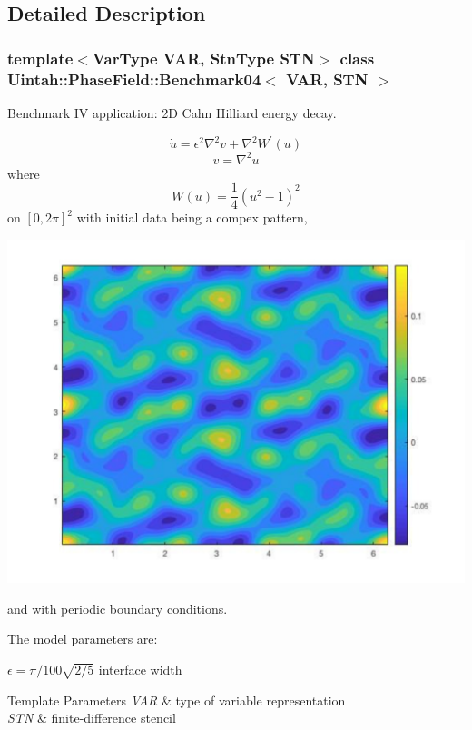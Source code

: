 \subsection{Detailed Description}
\subsubsection*{template$<$Var\+Type V\+AR, Stn\+Type S\+TN$>$\newline
class Uintah\+::\+Phase\+Field\+::\+Benchmark04$<$ V\+A\+R, S\+T\+N $>$}

Benchmark IV application\+: 2D Cahn Hilliard energy decay. 

\[ \dot u = \epsilon^2 \nabla^2 v + \nabla^2 W^\prime(u) \] \[ v = \nabla^2 u \] where \[ W (u) = \frac{1}{4} (u^2 − 1)^2 \] on $[0, 2\pi]^2$ with initial data being a compex pattern,


\begin{DoxyImage}
\includegraphics[width=\textwidth,height=\textheight/2,keepaspectratio=true]{benchmark04_ic}
\end{DoxyImage}
 and with periodic boundary conditions.

The model parameters are\+:
\begin{DoxyItemize}
\item $ \epsilon = \pi/100 \sqrt{2/5} $ interface width
\end{DoxyItemize}


\begin{DoxyTemplParams}{Template Parameters}
{\em V\+AR} & type of variable representation \\
\hline
{\em S\+TN} & finite-\/difference stencil \\
\hline
\end{DoxyTemplParams}


